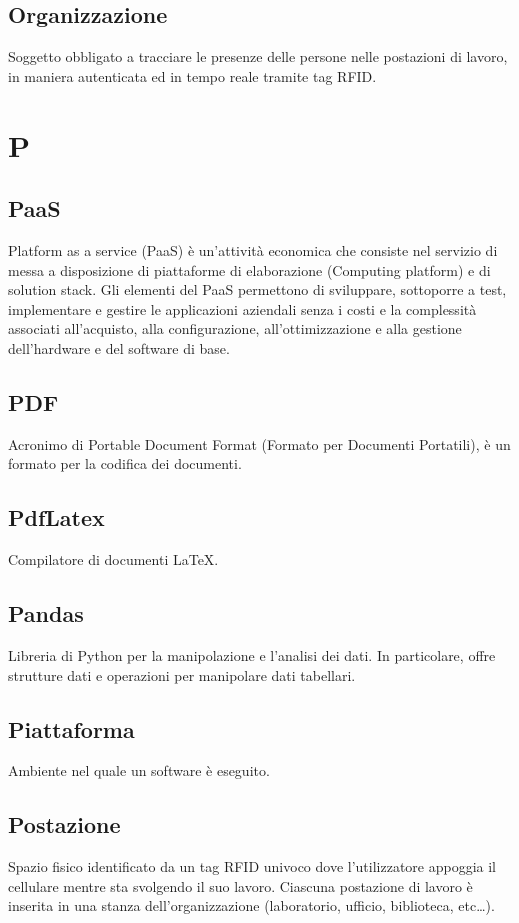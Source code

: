 \subsection{Organizzazione} Soggetto obbligato a tracciare le presenze delle persone nelle postazioni di lavoro, in maniera autenticata ed in tempo reale tramite tag RFID. 
\newpage \section{P}
\subsection{PaaS} Platform as a service (PaaS) è un'attività economica che consiste nel servizio di messa a disposizione di piattaforme di elaborazione (Computing platform) e di solution stack. Gli elementi del PaaS permettono di sviluppare, sottoporre a test, implementare e gestire le applicazioni aziendali senza i costi e la complessità associati all'acquisto, alla configurazione, all'ottimizzazione e alla gestione dell'hardware e del software di base.
\subsection{PDF} Acronimo di Portable Document Format (Formato per Documenti Portatili), è un formato per la codifica dei documenti.
\subsection{PdfLatex} Compilatore di documenti \LaTeX.
\subsection{Pandas} Libreria di Python per la manipolazione e l'analisi dei dati. In particolare, offre strutture dati e operazioni per manipolare dati tabellari.
\subsection{Piattaforma} Ambiente nel quale un software è eseguito.
\subsection{Postazione} Spazio fisico identificato da un tag RFID univoco dove l’utilizzatore appoggia il cellulare mentre sta svolgendo il suo lavoro. Ciascuna postazione di lavoro è inserita in una stanza
dell'organizzazione (laboratorio, ufficio, biblioteca, etc\dots).
